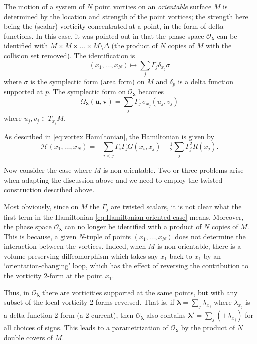 \documentclass[11pt,twoside]{article}
\theoremstyle{definition}
\numberwithin{equation}{section}
\def\blambda{{\boldsymbol\lambda}}
\begin{document}
The motion of a system of $N$ point vortices on an \emph{orientable} surface $M$ is determined by the location and strength of the point vortices; the strength here being the (scalar) vorticity concentrated at a point, in the form of delta functions.  
In this case, it was pointed out in \cite{Marsden-Weinstein-Vortices} that the phase space $\mathcal{O}_\blambda$ can be identified with $M\times M\times\dots \times M\setminus\Delta$ (the product of $N$ copies of $M$ with the collision set removed). The identification is 
\begin{equation}\label{eq:phase space - oriented case}
(x_1,\dots,x_N) \longmapsto \sum_j\Gamma_j\delta_{x_j}\sigma
\end{equation}
where $\sigma$ is the symplectic form (area form) on $M$ and $\delta_p$ is a delta function supported at $p$. The symplectic form on $\mathcal{O}_\blambda$ becomes
$$\Omega_\blambda(\mathbf{u},\mathbf{v}) = \sum_j\Gamma_j\,\sigma_{x_j}(u_j,v_j)$$
where $u_j,v_j\in T_{x_j}M$.

As described in \eqref{eq:vortex Hamiltonian}, the Hamiltonian is given by 
\begin{equation}\label{eq:Hamiltonian oriented case}
\mathcal{H}(x_1,\dots,x_N) = -\sum_{i<j} \Gamma_i\Gamma_j G(x_i,x_j) -  \tfrac12\sum_j\Gamma_j^2 R(x_j).
\end{equation}



Now consider the case where $M$ is non-orientable. Two or three problems arise when adapting the discussion above and we need to employ the twisted construction described above. 


Most obviously, since on $M$ the $\Gamma_j$ are twisted scalars, it is not clear what the first term in the Hamiltonian \eqref{eq:Hamiltonian oriented case} means.  Moreover, the phase space $\mathcal{O}_\blambda$ can no longer be identified with a product of $N$ copies of $M$. This is because, a given $N$-tuple of points $(x_1,\dots,x_N)$ does not determine the interaction between the vortices. Indeed, when $M$ is non-orientable, there is a volume preserving diffeomorphism which takes say $x_1$ back to $x_1$ by an `orientation-changing' loop, which has the effect of reversing the contribution to the vorticity 2-form at the point $x_1$. 

Thus, in $\mathcal{O}_\blambda$ there are vorticities supported at the same points, but with any subset of the local vorticity 2-forms reversed.  That is, if
$\blambda=\sum_j\lambda_{x_j}$
where $\lambda_{x_j}$ is a delta-function 2-form (a 2-current), then $\mathcal{O}_\blambda$ also contains
$\blambda'=\sum_j(\pm\lambda_{x_j})$
for all choices of signs.  This leads to a parametrization of $\mathcal{O}_\blambda$ by the product of $N$ double covers of $M$. 
\end{document}
